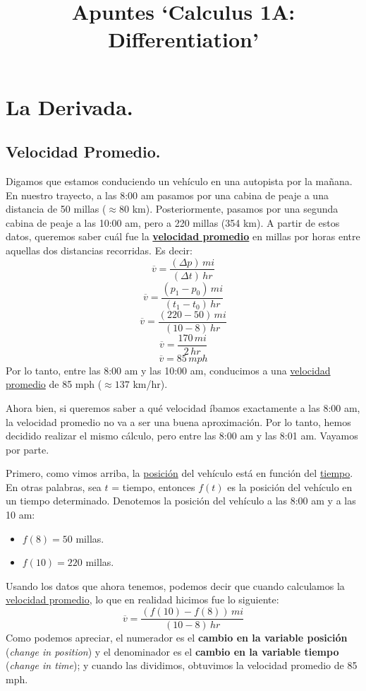 \documentclass[12pt]{article}
\begin{document}
\title{Apuntes `Calculus 1A: Differentiation'}
\author{}
\date{}
\maketitle

\tableofcontents

\newpage

\section{La Derivada.}

\subsection{Velocidad Promedio.}

Digamos que estamos conduciendo un vehículo en una autopista por la mañana. En nuestro trayecto, a las 8:00 am pasamos por una cabina de peaje a una distancia de 50 millas ($\approx 80$ km). Posteriormente, pasamos por una segunda cabina de peaje a las 10:00 am, pero a 220 millas (354 km). A partir de estos datos, queremos saber cuál fue la \textbf{\underline{velocidad promedio}} en millas por horas entre aquellas dos distancias recorridas. Es decir:
\[\overline{v} = \frac{(\Delta p) \, mi}{(\Delta t) \, hr}\]
\[\overline{v} = \frac{(p_{1} - p_{0})\, mi}{(t_{1} - t_{0}) \, hr}\]
\[\overline{v} = \frac{(220 - 50) \, mi}{(10 - 8) \, hr}\]
\[\overline{v} = \frac{170 \, mi}{2 \, hr}\]
\[\overline{v} = 85 \, mph\]
Por lo tanto, entre las 8:00 am y las 10:00 am, conducimos a una \underline{velocidad promedio} de 85 mph ($\approx 137$ km/hr).

Ahora bien, si queremos saber a qué velocidad íbamos exactamente a las 8:00 am, la velocidad promedio no va a ser una buena aproximación. Por lo tanto, hemos decidido realizar el mismo cálculo, pero entre las 8:00 am y las 8:01 am. Vayamos por parte.

Primero, como vimos arriba, la \underline{posición} del vehículo está en función del \underline{tiempo}. En otras palabras, sea $t$ = tiempo, entonces $f(t)$ es la posición del vehículo en un tiempo determinado. Denotemos la posición del vehículo a las 8:00 am y a las 10 am:
\begin{itemize}
\item $f(8) = 50$ millas.
\item $f(10) = 220$ millas.
\end{itemize}

Usando los datos que ahora tenemos, podemos decir que cuando calculamos la \underline{velocidad promedio}, lo que en realidad hicimos fue lo siguiente:
\[\overline{v} = \frac{(f(10) - f(8))\, mi}{(10 - 8) \, hr}\]
Como podemos apreciar, el numerador es el \textbf{cambio en la variable posición} (\textit{change in position}) y el denominador es el \textbf{cambio en la variable tiempo} (\textit{change in time}); y cuando las dividimos, obtuvimos la velocidad promedio de 85 mph.
\end{document}
